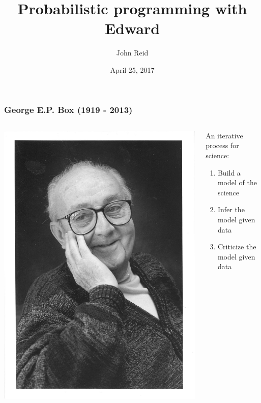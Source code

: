 \documentclass[10pt]{beamer}
\title{Probabilistic programming with Edward}
\date{April 25, 2017}
\author{John Reid}
\institute{Biostatistics Unit, \\ School of Clinical Medicine, \\ Cambridge University}
\begin{document}
\maketitle

\begin{frame}
\frametitle{George E.P. Box (1919 - 2013)}
\begin{columns}
\begin{column}{0.4\textwidth}
    \begin{center}
     \includegraphics[width=\columnwidth]{img/box.jpg}
     \end{center}
\end{column}
\begin{column}{0.6\textwidth}
An iterative process for science:
\\[1ex]
\begin{enumerate}
\item Build a model of the science
\\[1ex]
\item Infer the model given data
\\[1ex]
\item Criticize the model given data
\end{enumerate}
\end{column}
\end{columns}
\citep{box_useful_1962-1, box_experimental_1965-1, box_discrimination_1967-1, box_science_1976-1, box_sampling_1980-1}
\end{frame}
\end{document}
